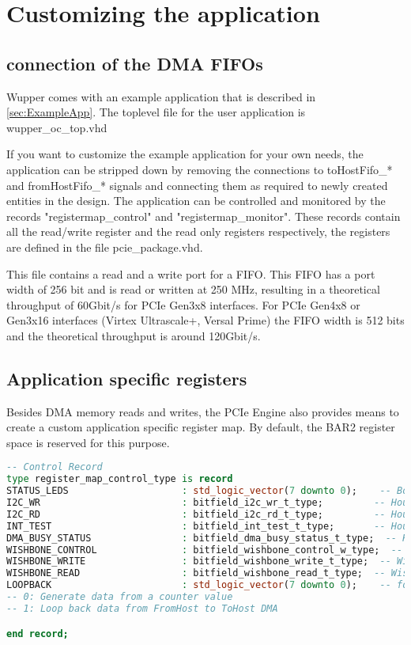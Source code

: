 \section{Customizing the application}
\subsection{connection of the DMA FIFOs}
Wupper comes with an example application that is described in \ref{sec:ExampleApp}. The toplevel file for the user application is wupper\_oc\_top.vhd

If you want to customize the example application for your own needs, the application can be stripped down by removing the connections to toHostFifo\_* and fromHostFifo\_* signals and connecting them as required to newly created entities in the design. The application can be controlled and monitored by the records "registermap\_control" and "registermap\_monitor". These records contain all the read/write register and the read only registers respectively, the registers are defined in the file pcie\_package.vhd.

This file contains a read and a write port for a FIFO. This FIFO has a port width of 256 bit and is read or written at 250 MHz, resulting in a theoretical throughput of 60Gbit/s for PCIe Gen3x8 interfaces. For PCIe Gen4x8 or Gen3x16 interfaces (Virtex Ultrascale+, Versal Prime) the FIFO width is 512 bits and the theoretical throughput is around 120Gbit/s.

\subsection{Application specific registers}
Besides DMA memory reads and writes, the PCIe Engine also provides means to create a custom application specific register map. By default, the BAR2 register space is reserved for this purpose.

\begin{lstlisting}[language=VHDL, frame=single, caption=custom register types]
  -- Control Record
type register_map_control_type is record
STATUS_LEDS                    : std_logic_vector(7 downto 0);    -- Board GPIO Leds
I2C_WR                         : bitfield_i2c_wr_t_type;         -- House Keeping Controls and Monitors 
I2C_RD                         : bitfield_i2c_rd_t_type;         -- House Keeping Controls and Monitors 
INT_TEST                       : bitfield_int_test_t_type;       -- House Keeping Controls and Monitors 
DMA_BUSY_STATUS                : bitfield_dma_busy_status_t_type;  -- House Keeping Controls and Monitors 
WISHBONE_CONTROL               : bitfield_wishbone_control_w_type;  -- Wishbone 
WISHBONE_WRITE                 : bitfield_wishbone_write_t_type;  -- Wishbone 
WISHBONE_READ                  : bitfield_wishbone_read_t_type;  -- Wishbone 
LOOPBACK                       : std_logic_vector(7 downto 0);    -- for every DMA descriptor
-- 0: Generate data from a counter value
-- 1: Loop back data from FromHost to ToHost DMA

end record;
\end{lstlisting}

